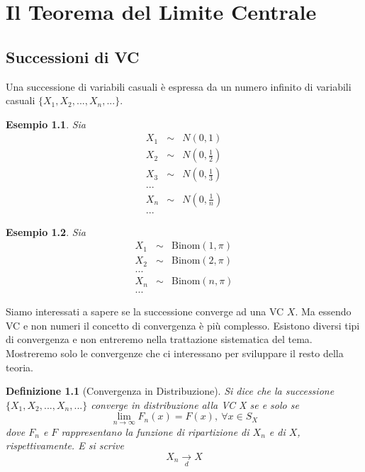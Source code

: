 \documentclass[
  11pt,
]{book}
\theoremstyle{mytheoremstyle}
\theoremstyle{mydefstyle}
\newtheorem{definition}{Definizione}[section]
\newtheorem{example}{{Esempio}}[section]
\begin{document}
\chapter{Il Teorema del Limite Centrale}\label{il-teorema-del-limite-centrale}

\section{Successioni di VC}\label{successioni-di-vc}

Una successione di variabili casuali è espressa da un numero infinito di
variabili casuali \(\{X_1,X_2,...,X_n,...\}\).

\begin{example}
Sia \begin{eqnarray*}
  X_1 &\sim& N\left(0,1\right)\\
  X_2 &\sim& N\left(0,\frac 12\right)\\
  X_3 &\sim& N\left(0,\frac 13\right)\\  
  ...\\
  X_n &\sim& N\left(0,\frac 1n\right)\\
  ...
\end{eqnarray*}
\end{example}

\begin{example}
Sia \begin{eqnarray*}
  X_1 &\sim& \text{Binom}\left(1,\pi\right)\\
  X_2 &\sim& \text{Binom}\left(2,\pi\right)\\
  ...\\
  X_n &\sim& \text{Binom}\left(n,\pi\right)\\
  ...
\end{eqnarray*}
\end{example}

Siamo interessati a sapere se la successione converge ad una VC \(X\). Ma
essendo VC e non numeri il concetto di convergenza è più complesso.
Esistono diversi tipi di convergenza e non entreremo nella trattazione
sistematica del tema. Mostreremo solo le convergenze che ci interessano
per sviluppare il resto della teoria.

\begin{definition}[Convergenza in Distribuzione]
Si dice che la successione \(\{X_1,X_2,...,X_n,...\}\) converge in
distribuzione alla VC X se e solo se
\[\lim_{n\to\infty}F_n(x)=F(x),~\forall x\in S_X\] dove \(F_n\) e \(F\)
rappresentano la funzione di ripartizione di \(X_n\) e di \(X\),
rispettivamente. E si scrive \[X_n\operatorname*{\rightarrow}_{d} X\]
\end{definition}
\end{document}

